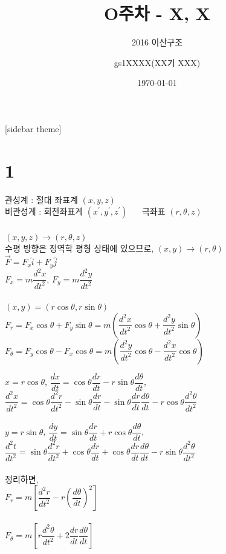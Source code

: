 \documentclass[11pt]{beamer}
\title[O주차 - X, X]{O주차 - X, X}
\subtitle[]{2016 이산구조}
\author[]{gs1XXXX(XX기 XXX)}
\institute[GSHS]{경기과학고등학교}
\date[]{\today}
\begin{document}
\begin{frame}[plain]
\titlepage
\end{frame}
[sidebar theme]



\section{1}
\begin{frame}{1.1}\footnotesize
	관성계 : 절대 좌표계 $ (x, y, z)$ \\
	비관성계 : 회전좌표계 $ (x^{\prime}, y^{\prime}, z^{\prime})$ ~~ 극좌표 $ (r, \theta, z)$\\
	\\
	$ (x, y, z) 	\rightarrow (r, \theta, z)$\\
	수평 방향은 정역학 평형 상태에 있으므로, 	$ (x, y) 	\rightarrow (r, \theta)$\\
	$ \overrightarrow {F} = F_{x} \hat{i}  + F_{y} \hat{j} $\\
	$ F_{x} = m \dfrac{d^{2}x}{dt^{2}}$, $ F_{y} = m \dfrac{d^{2}y}{dt^{2}}$\\
	\\
	$ (x, y) = (r \cos \theta, r \sin \theta)$\\
	$ F_{r} = F_{x} \cos \theta + F_{y} \sin \theta = m \left ( \dfrac{d^{2}x}{dt^{2}} \cos \theta + \dfrac{d^{2}y}{dt^{2}} \sin \theta \right) $\\
	$ F_{\theta} = F_{y} \cos \theta - F_{x} \cos \theta = m \left ( \dfrac{d^{2}y}{dt^{2}} \cos \theta - \dfrac{d^{2}x}{dt^{2}} \cos \theta \right) $\\
\end{frame}

\begin{frame}{1.2}\footnotesize
	$ x = r \cos \theta $, $\dfrac{dx}{dt} = \cos \theta \dfrac{dr}{dt} - r \sin \theta \dfrac{d\theta}{dt}$, \\
	$\dfrac{d^{2}x}{dt^{2}} = \cos \theta \dfrac{d^{2}r}{dt^{2}} - \sin \theta \dfrac{dr}{dt} - \sin \theta \dfrac{dr}{dt} \dfrac{d\theta}{dt} -r \cos \theta \dfrac{d^{2}\theta}{dt^{2}}$\\
	\\
	$ y = r \sin \theta $, $\dfrac{dy}{dt} = \sin \theta \dfrac{dr}{dt} + r \cos \theta \dfrac{d\theta}{dt}$, \\
	$\dfrac{d^{2}t}{dt^{2}} = \sin \theta \dfrac{d^{2}r}{dt^{2}} + \cos \theta \dfrac{dr}{dt} + \cos \theta \dfrac{dr}{dt} \dfrac{d\theta}{dt} -r \sin \theta \dfrac{d^{2}\theta}{dt^{2}}$\\
	\\

	정리하면, \\
	
	$ F_{r} = m \left[ \dfrac{d^{2}r}{dt^{2}} - r \left( {\dfrac{d \theta}{dt}} \right)^{2} \right] $\\
	\\
	$ F_{\theta} = m \left[ r \dfrac{d^{2}\theta}{dt^{2}} + 2 \dfrac{dr}{dt} \dfrac{d\theta}{dt}  \right] $\\

\end{frame}
\end{document}
